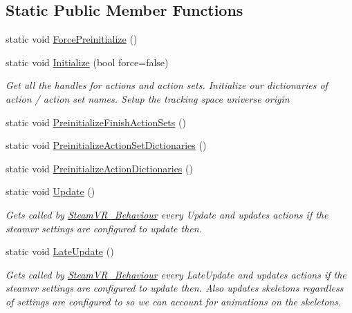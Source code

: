 \subsection*{Static Public Member Functions}
\begin{DoxyCompactItemize}
\item 
static void \mbox{\hyperlink{class_valve_1_1_v_r_1_1_steam_v_r___input_a305a60db4634439fc9cbbe0a64b0c5fb}{Force\+Preinitialize}} ()
\item 
static void \mbox{\hyperlink{class_valve_1_1_v_r_1_1_steam_v_r___input_ac9a4c04c5c0da11d4b52b2b9cca9b120}{Initialize}} (bool force=false)
\begin{DoxyCompactList}\small\item\em Get all the handles for actions and action sets. Initialize our dictionaries of action / action set names. Setup the tracking space universe origin \end{DoxyCompactList}\item 
static void \mbox{\hyperlink{class_valve_1_1_v_r_1_1_steam_v_r___input_a84cea4c4f233d2a4c1576404af92c106}{Preinitialize\+Finish\+Action\+Sets}} ()
\item 
static void \mbox{\hyperlink{class_valve_1_1_v_r_1_1_steam_v_r___input_a0f7555c8c991d837c557a0f875faa73c}{Preinitialize\+Action\+Set\+Dictionaries}} ()
\item 
static void \mbox{\hyperlink{class_valve_1_1_v_r_1_1_steam_v_r___input_a407e1e3d417f1555b8b32efb54e08eca}{Preinitialize\+Action\+Dictionaries}} ()
\item 
static void \mbox{\hyperlink{class_valve_1_1_v_r_1_1_steam_v_r___input_a44aeadc921fc991c03d70db06fbfad0a}{Update}} ()
\begin{DoxyCompactList}\small\item\em Gets called by \mbox{\hyperlink{class_valve_1_1_v_r_1_1_steam_v_r___behaviour}{Steam\+V\+R\+\_\+\+Behaviour}} every Update and updates actions if the steamvr settings are configured to update then. \end{DoxyCompactList}\item 
static void \mbox{\hyperlink{class_valve_1_1_v_r_1_1_steam_v_r___input_a1a82a3a13e2455a0b4bde911d01fb4ef}{Late\+Update}} ()
\begin{DoxyCompactList}\small\item\em Gets called by \mbox{\hyperlink{class_valve_1_1_v_r_1_1_steam_v_r___behaviour}{Steam\+V\+R\+\_\+\+Behaviour}} every Late\+Update and updates actions if the steamvr settings are configured to update then. Also updates skeletons regardless of settings are configured to so we can account for animations on the skeletons. \end{DoxyCompactList}\item 

\end{DoxyCompactItemize}
